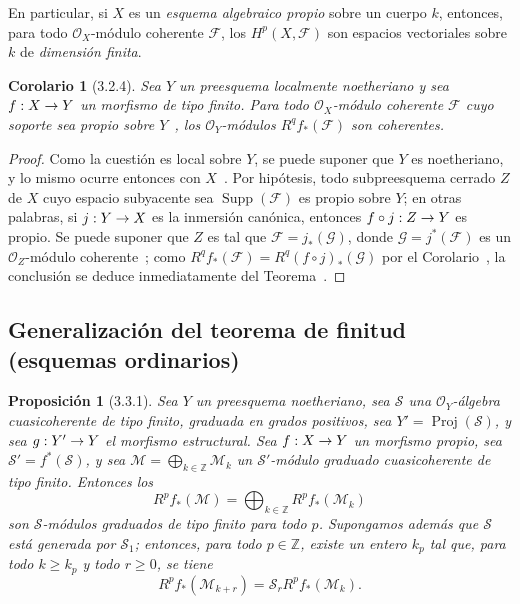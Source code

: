 \documentclass[10pt,oneside,openany]{book}
\theoremstyle{egaenv}\newtheorem*{env}{---}
\theoremstyle{egastatement}
\newtheorem*{proposition}{Proposición}
\newtheorem*{corollary}{Corolario}
\theoremstyle{egadescription}
\newcommand{\oldpage}[2][]{\marginnote{\normalfont\scriptsize\textbf{#1}\,|\,#2}\ignorespaces}
\renewcommand{\geq}{\geqslant}
\renewcommand{\to}{\mathchoice{\longrightarrow}{\rightarrow}{\rightarrow}{\rightarrow}}
\begin{document}
En particular, si $X$ es un \emph{esquema algebraico propio} sobre un cuerpo $k$, entonces, para todo $\mathcal O_X$-módulo coherente $\mathcal F$, los $H^p(X,\mathcal F)$ son espacios vectoriales sobre $k$ de \emph{dimensión finita}.

\begin{corollary}[3.2.4]
\label{III.3.2.4}
\label{III.3.2.4-fr}
Sea $Y$ un preesquema localmente noetheriano y sea $f:X\to Y$ un morfismo de tipo finito.
Para todo $\mathcal O_X$-módulo coherente $\mathcal F$ cuyo soporte sea propio sobre $Y$~, los $\mathcal O_Y$-módulos $R^qf_*(\mathcal F)$ son coherentes.
\end{corollary}

\oldpage[III]{118}
\begin{proof}
Como la cuestión es local sobre $Y$, se puede suponer que $Y$ es noetheriano, y lo mismo ocurre entonces con $X$~.
Por hipótesis, todo subpreesquema cerrado $Z$ de $X$ cuyo espacio subyacente sea $\operatorname{Supp}(\mathcal F)$ es propio sobre $Y$; en otras palabras, si $j:Y\to X$ es la inmersión canónica, entonces $f\circ j:Z\to Y$ es propio.
Se puede suponer que $Z$ es tal que $\mathcal F=j_*(\mathcal G)$, donde $\mathcal G=j^*(\mathcal F)$ es un $\mathcal O_Z$-módulo coherente~; como $R^qf_*(\mathcal F)=R^q(f\circ j)_*(\mathcal G)$ por el Corolario~, la conclusión se deduce inmediatamente del Teorema~.
\end{proof}

\subsection{Generalización del teorema de finitud (esquemas ordinarios)}
\label{subsection:III.3.3}
\label{subsection:III.3.3-fr}

\begin{proposition}[3.3.1]
\label{III.3.3.1}
\label{III.3.3.1-fr}
Sea $Y$ un preesquema noetheriano, sea $\mathcal S$ una $\mathcal O_Y$-álgebra cuasicoherente de tipo finito, graduada en grados positivos, sea $Y'=\operatorname{Proj}(\mathcal S)$, y sea $g:Y'\to Y$ el morfismo estructural.
Sea $f:X\to Y$ un morfismo propio, sea $\mathcal S'=f^*(\mathcal S)$, y sea $\mathcal M=\bigoplus_{k\in\mathbb Z}\mathcal M_k$ un $\mathcal S'$-módulo graduado cuasicoherente de tipo finito.
Entonces los \[
R^pf_*(\mathcal M)=\bigoplus_{k\in\mathbb Z}R^pf_*(\mathcal M_k)
\] son $\mathcal S$-módulos graduados de tipo finito para todo $p$.
Supongamos además que $\mathcal S$ está generada por $\mathcal S_1$; entonces, para todo $p\in\mathbb Z$, existe un entero $k_p$ tal que, para todo $k\geq k_p$ y todo $r\geq0$, se tiene
\[
R^pf_*(\mathcal M_{k+r})=\mathcal S_rR^pf_*(\mathcal M_k).
\tag{3.3.1.1}\label{III.3.3.1.1-fr}
\] 
\end{proposition}
\end{document}
